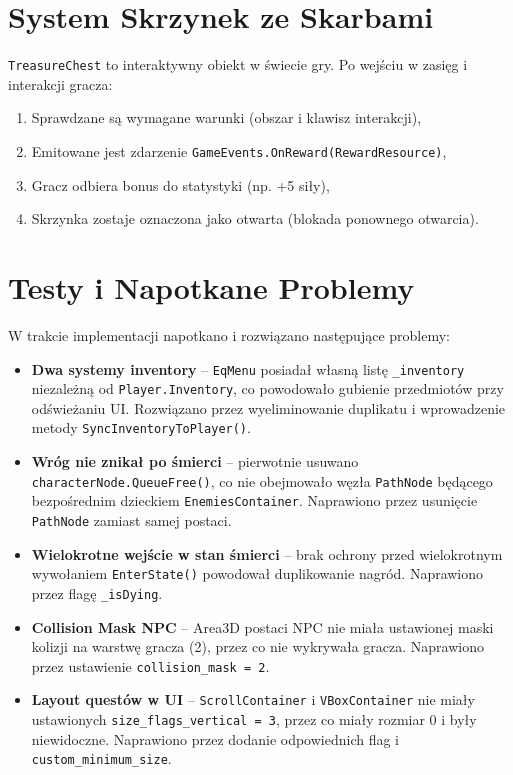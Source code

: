 \section{System Skrzynek ze Skarbami}

\texttt{TreasureChest} to interaktywny obiekt w świecie gry. Po wejściu w zasięg i interakcji gracza:
\begin{enumerate}
    \item Sprawdzane są wymagane warunki (obszar i klawisz interakcji),
    \item Emitowane jest zdarzenie \texttt{GameEvents.OnReward(RewardResource)},
    \item Gracz odbiera bonus do statystyki (np. +5 siły),
    \item Skrzynka zostaje oznaczona jako otwarta (blokada ponownego otwarcia).
\end{enumerate}

\section{Testy i Napotkane Problemy}

W trakcie implementacji napotkano i rozwiązano następujące problemy:

\begin{itemize}
    \item \textbf{Dwa systemy inventory} – \texttt{EqMenu} posiadał własną listę \texttt{\_inventory} niezależną od \texttt{Player.Inventory}, co powodowało gubienie przedmiotów przy odświeżaniu UI. Rozwiązano przez wyeliminowanie duplikatu i wprowadzenie metody \texttt{SyncInventoryToPlayer()}.
    \item \textbf{Wróg nie znikał po śmierci} – pierwotnie usuwano \texttt{characterNode.QueueFree()}, co nie obejmowało węzła \texttt{PathNode} będącego bezpośrednim dzieckiem \texttt{EnemiesContainer}. Naprawiono przez usunięcie \texttt{PathNode} zamiast samej postaci.
    \item \textbf{Wielokrotne wejście w stan śmierci} – brak ochrony przed wielokrotnym wywołaniem \texttt{EnterState()} powodował duplikowanie nagród. Naprawiono przez flagę \texttt{\_isDying}.
    \item \textbf{Collision Mask NPC} – Area3D postaci NPC nie miała ustawionej maski kolizji na warstwę gracza (2), przez co nie wykrywała gracza. Naprawiono przez ustawienie \texttt{collision\_mask = 2}.
    \item \textbf{Layout questów w UI} – \texttt{ScrollContainer} i \texttt{VBoxContainer} nie miały ustawionych \texttt{size\_flags\_vertical = 3}, przez co miały rozmiar 0 i były niewidoczne. Naprawiono przez dodanie odpowiednich flag i \texttt{custom\_minimum\_size}.
\end{itemize}
